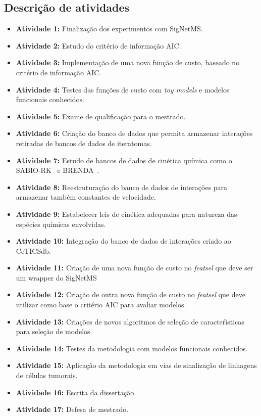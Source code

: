 \documentclass[12pt]{article}
\begin{document}
\subsection{Descrição de atividades}
\begin{itemize}
    \item{\bf Atividade 1:} Finalização dos experimentos com SigNetMS.
    \item{\bf Atividade 2:} Estudo do critério de informação AIC.
    \item{\bf Atividade 3:} Implementação de uma nova função de custo,
        baseado no critério de informação AIC.
    \item{\bf Atividade 4:} Testes das funções de custo com 
        {\em toy models} e modelos funcionais conhecidos.
    \item{\bf Atividade 5:} Exame de qualificação para o mestrado.
    \item{\bf Atividade 6:} Criação do banco de dados que permita
        armazenar interações retiradas de bancos de dados de iteratomas.
    \item{\bf Atividade 7:} Estudo de bancos de dados de cinética 
        química como o SABIO-RK~\cite{doi:10.1093/nar/gkr1046} e 
        BRENDA~\cite{doi:10.1093/nar/gkh081}.
    \item{\bf Atividade 8:} Reestruturação do banco de dados de interações para 
        armazenar também constantes de velocidade.
    \item{\bf Atividade 9:} Estabelecer leis de cinética adequadas para natureza das
        espécies químicas envolvidas.
    \item{\bf Atividade 10:} Integração do banco de dados de interações 
        criado ao CeTICSdb.
    \item{\bf Atividade 11:} Criação de uma nova função de custo no 
        {\em featsel} que deve ser um wrapper do SigNetMS
    \item{\bf Atividade 12:} Criação de outra nova função de custo no
        {\em featsel} que deve utilizar como base o critério AIC para 
        avaliar modelos.
    \item{\bf Atividade 13:} Criações de novos algoritmos de seleção de
        caracteŕísticas para seleção de modelos.
    \item{\bf Atividade 14:} Testes da metodologia com modelos 
        funcionais conhecidos.
    \item{\bf Atividade 15:} Aplicação da metodologia em vias de 
        sinalização de linhagens de células tumorais.
    \item{\bf Atividade 16:} Escrita da dissertação.
    \item{\bf Atividade 17:} Defesa de mestrado.
\end{itemize}
\end{document}
